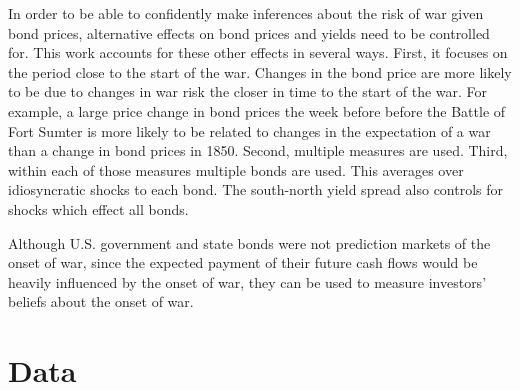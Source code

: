 \documentclass[]{article}\usepackage[]{graphicx}\usepackage[]{color}
\begin{document}
In order to be able to confidently make inferences about the risk of war given bond prices, alternative effects on bond prices and yields need to be controlled for.
This work accounts for these other effects in several ways.
First, it focuses on the period close to the start of the war.
Changes in the bond price are more likely to be due to changes in war risk the closer in time to the start of the war.
For example, a large price change in bond prices the week before before the Battle of Fort Sumter is more likely to be related to changes in the expectation of a war than a change in bond prices in 1850.
Second, multiple measures are used.
Third, within each of those measures multiple bonds are used.
This averages over idiosyncratic shocks to each bond.
The south-north yield spread also controls for shocks which effect all bonds.

Although U.S. government and state bonds were not prediction markets of the onset of war, since the expected payment of their future cash flows would be heavily influenced by the onset of war, they can be used to measure investors' beliefs about the onset of war.

\section{Data}
\label{sec:data}
\end{document}
